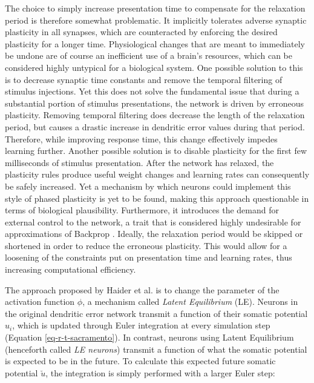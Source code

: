 The choice to simply increase presentation time to compensate for the relaxation period is therefore somewhat
problematic. It implicitly tolerates adverse synaptic plasticity in all synapses, which are counteracted by enforcing
the desired plasticity for a longer time. Physiological changes that are meant to immediately be undone are of course an
inefficient use of a brain's resources, which can be considered highly untypical for a biological system. One possible
solution to this is to decrease synaptic time constants and remove the temporal filtering of stimulus injections. Yet
this does not solve the fundamental issue that during a substantial portion of stimulus presentations, the network is
driven by erroneous plasticity. Removing temporal filtering does decrease the length of the relaxation period, but
causes a drastic increase in dendritic error values during that period. Therefore, while improving response time, this
change effectively impedes learning further. Another possible solution is to disable plasticity for the first few milliseconds
of stimulus presentation. After the network has relaxed, the plasticity rules produce useful weight changes and learning
rates can consequently be safely increased. Yet a mechanism by which neurons could implement this style of phased
plasticity is yet to be found, making this approach questionable in terms of biological plausibility. Furthermore, it
introduces the demand for external control to the network, a trait that is considered highly undesirable for
approximations of Backprop \citep{whittington2019theories}. Ideally, the relaxation period would be skipped or
shortened in order to reduce the erroneous plasticity. This would allow for a loosening of the constraints put on
presentation time and learning rates, thus increasing computational efficiency.



The approach proposed by Haider et al. is to change the parameter of the activation function $\phi$, a mechanism called
\textit{Latent Equilibrium} (LE). Neurons in the original dendritic error network transmit a function of their somatic
potential $u_i$, which is updated through Euler integration at every simulation step (Equation \ref{eq-r-t-sacramento}).
In contrast, neurons using Latent Equilibrium (henceforth called \textit{LE neurons}) transmit a function of what the
somatic potential is expected to be in the future. To calculate this expected future somatic potential $\breve{u}$, the
integration is simply performed with a larger Euler step:

